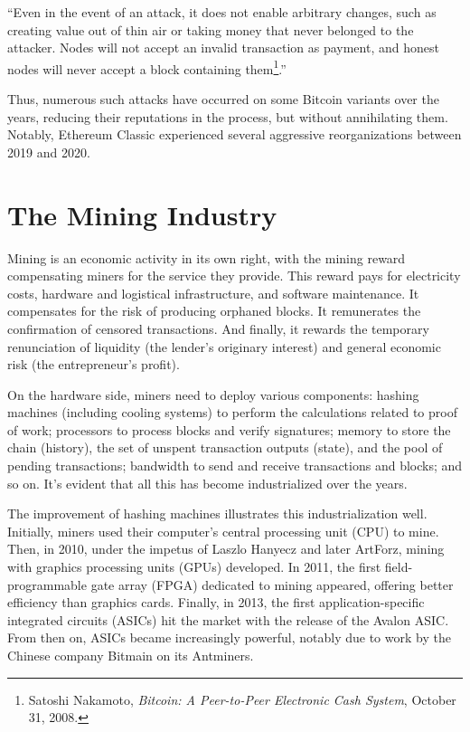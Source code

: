 \documentclass[
  a5paper,
  smalldemyvopaper,10pt,twoside,onecolumn,openright,extrafontsizes,hidelinks]{memoir}
\begin{document}
``Even in the event of an attack, it does not enable arbitrary changes,
such as creating value out of thin air or taking money that never
belonged to the attacker. Nodes will not accept an invalid transaction
as payment, and honest nodes will never accept a block containing
them\footnote{Satoshi Nakamoto, \emph{Bitcoin: A Peer-to-Peer Electronic
  Cash System}, October 31, 2008.}.''

Thus, numerous such attacks have occurred on some Bitcoin variants over
the years, reducing their reputations in the process, but without
annihilating them. Notably, Ethereum Classic experienced several
aggressive reorganizations between 2019 and 2020.

\section*{The Mining Industry}\label{lindustrie-miniuxe8re}


Mining is an economic activity in its own right, with the mining reward
compensating miners for the service they provide. This reward pays for
electricity costs, hardware and logistical infrastructure, and software
maintenance. It compensates for the risk of producing orphaned blocks.
It remunerates the confirmation of censored transactions. And finally,
it rewards the temporary renunciation of liquidity (the lender's
originary interest) and general economic risk (the entrepreneur's
profit).

On the hardware side, miners need to deploy various components: hashing
machines (including cooling systems) to perform the calculations related
to proof of work; processors to process blocks and verify signatures;
memory to store the chain (history), the set of unspent transaction
outputs (state), and the pool of pending transactions; bandwidth to send
and receive transactions and blocks; and so on. It's evident that all
this has become industrialized over the years.

The improvement of hashing machines illustrates this industrialization
well. Initially, miners used their computer's central processing unit
(CPU) to mine. Then, in 2010, under the impetus of Laszlo Hanyecz and
later ArtForz, mining with graphics processing units (GPUs) developed.
In 2011, the first field-programmable gate array (FPGA) dedicated to
mining appeared, offering better efficiency than graphics cards.
Finally, in 2013, the first application-specific integrated circuits
(ASICs) hit the market with the release of the Avalon ASIC. From then
on, ASICs became increasingly powerful, notably due to work by the
Chinese company Bitmain on its Antminers.
\end{document}
